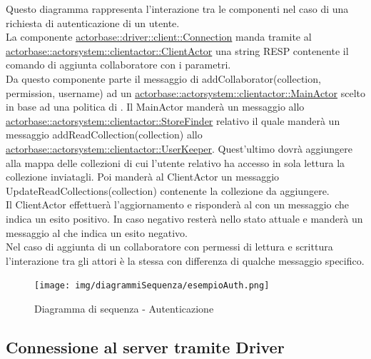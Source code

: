 \documentclass{scalatekids-article}
\begin{document}
Questo diagramma rappresenta l'interazione tra le componenti nel caso di una richiesta di autenticazione di un utente.\\
La componente \hyperref[sec:actorbase::driver::client::Connection]{actorbase::driver::client::Connection}
manda tramite  al \hyperref[sec:actorbase::actorsystem::clientactor::ClientActor]{actorbase::actorsystem::clientactor::ClientActor}
una string RESP contenente il comando di aggiunta collaboratore  con
i parametri.\\ %
Da questo componente parte il messaggio di addCollaborator(collection, permission, username) ad un \hyperref[sec:actorbase::actorsystem::clientactor::MainActor]{actorbase::actorsystem::clientactor::MainActor} scelto in base ad una
politica di . Il MainActor manderà un messaggio allo
\hyperref[sec:actorbase::actorsystem::clientactor::StoreFinder]{actorbase::actorsystem::clientactor::StoreFinder}
relativo il quale manderà un messaggio addReadCollection(collection) allo
\hyperref[sec:actorbase::actorsystem::clientactor::UserKeeper]{actorbase::actorsystem::clientactor::UserKeeper}.
Quest'ultimo dovrà aggiungere alla mappa delle collezioni di cui l'utente
relativo ha accesso in sola lettura la collezione inviatagli.
Poi manderà al ClientActor un messaggio UpdateReadCollections(collection)
contenente la collezione da aggiungere.\\
Il ClientActor effettuerà l'aggiornamento e risponderà al 
con un messaggio che indica un esito positivo. In caso negativo resterà nello
stato attuale e manderà un messaggio al  che indica un esito
negativo.\\
Nel caso di aggiunta di un collaboratore con permessi di lettura e scrittura
l'interazione tra gli attori è la stessa con differenza di qualche messaggio
specifico.\\
\begin{figure}[H]
  \begin{center}
    \texttt{[image: img/diagrammiSequenza/esempioAuth.png]}
    \caption{Diagramma di sequenza - Autenticazione}
  \end{center}
\end{figure}

\subsection{Connessione al server tramite Driver}
\end{document}

